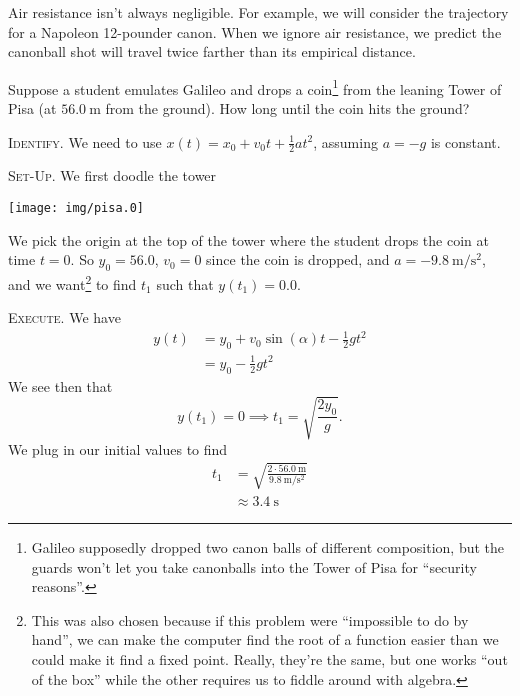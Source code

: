 \begin{rmk}[Assumptions]
Air resistance isn't always negligible. For example, we will consider
the trajectory for a Napoleon 12-pounder canon. When we ignore air
resistance, we predict the canonball shot will travel twice farther
than its empirical distance.
\end{rmk}

\workedExamples{}

Suppose a student emulates Galileo and drops a coin\footnote{Galileo
  supposedly dropped two canon balls of different composition, but
  the guards won't let you take canonballs into the Tower of Pisa for
  ``security reasons''.} from the
leaning Tower of Pisa (at $\SI{56.0}{\meter}$ from the ground). How
long until the coin hits the ground? 

\textsc{Identify.} We need to use
$x(t)=x_{0}+v_{0}t+\frac{1}{2}at^{2}$, assuming $a=-g$ is
constant. 

\textsc{Set-Up.}
We first doodle the tower
\begin{center}
  \texttt{[image: img/pisa.0]}
\end{center}
We pick the origin at the top of the tower where the student
drops the coin at time $t=0$. So $y_{0}=56.0$, $v_{0}=0$ since the
coin is dropped, and $a=\SI{-9.8}{\meter\per\second\squared}$, and we
want\footnote{This was also chosen because if this problem were
  ``impossible to do by hand'', we can make the computer find the root
  of a function easier than we could make it find a fixed point. Really,
they're the same, but one works ``out of the box'' while the other
requires us to fiddle around with algebra.} to find $t_{1}$ such that $y(t_{1})=0.0$.

\textsc{Execute.}
We have
\begin{equation}
\begin{split}
y(t) &= y_{0} + v_{0}\sin(\alpha)t - \frac{1}{2}gt^{2}\\
&=y_{0} - \frac{1}{2}gt^{2}
\end{split}
\end{equation}
We see then that
\begin{equation}
y(t_{1}) = 0\implies t_{1}=\sqrt{\frac{2y_{0}}{g}}.
\end{equation}
We plug in our initial values to find
\begin{equation}
\begin{split}
t_{1} &= \sqrt{\frac{2\cdot\SI{56.0}{\meter}}{\SI{9.8}{\meter\per\second\squared}}}\\
&\approx \SI{3.4}{\second}
\end{split}
\end{equation}

